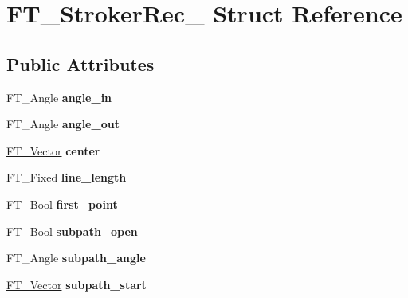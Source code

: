 \hypertarget{struct_f_t___stroker_rec__}{}\section{F\+T\+\_\+\+Stroker\+Rec\+\_\+ Struct Reference}
\label{struct_f_t___stroker_rec__}
\subsection*{Public Attributes}
\begin{DoxyCompactItemize}
\item 
\mbox{\label{struct_f_t___stroker_rec___aadfca07b64504ba811ff9e6368730f54}} 
F\+T\+\_\+\+Angle {\bfseries angle\+\_\+in}
\item 
\mbox{\label{struct_f_t___stroker_rec___aeda942b373d6b59f7897bf1a7b995c80}} 
F\+T\+\_\+\+Angle {\bfseries angle\+\_\+out}
\item 
\mbox{\label{struct_f_t___stroker_rec___a234a7706b9f5cae4b10bfdf190295e64}} 
\hyperlink{struct_f_t___vector__}{F\+T\+\_\+\+Vector} {\bfseries center}
\item 
\mbox{\label{struct_f_t___stroker_rec___a69f0a2dcd66cb3d3c055b1acce57366c}} 
F\+T\+\_\+\+Fixed {\bfseries line\+\_\+length}
\item 
\mbox{\label{struct_f_t___stroker_rec___ac070264861fbe81c96fc600712647da6}} 
F\+T\+\_\+\+Bool {\bfseries first\+\_\+point}
\item 
\mbox{\label{struct_f_t___stroker_rec___a2f21e742ab0a67d72f96642874c7c0a5}} 
F\+T\+\_\+\+Bool {\bfseries subpath\+\_\+open}
\item 
\mbox{\label{struct_f_t___stroker_rec___a6f8b76c49aa6c7ce0f079ccda7e400ec}} 
F\+T\+\_\+\+Angle {\bfseries subpath\+\_\+angle}
\item 
\mbox{\label{struct_f_t___stroker_rec___a05aee6db9599e5d0494d898e1ea32675}} 
\hyperlink{struct_f_t___vector__}{F\+T\+\_\+\+Vector} {\bfseries subpath\+\_\+start}

\end{DoxyCompactItemize}

